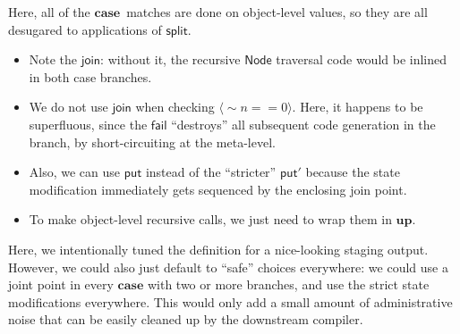 \documentclass[acmsmall,screen,review,anonymous]{acmart}
\newcommand{\mit}[1]{{\mathsf{#1}}}
\newcommand{\msf}[1]{{\mathsf{#1}}}
\newcommand{\mbf}[1]{{\mathbf{#1}}}
\newcommand{\bs}[1]{\boldsymbol{#1}}
\newcommand{\Node}{\msf{Node}}
\newcommand{\case}{\mbf{case\,}}
\newcommand{\spl}{{\bs{\sim}}}
\newcommand{\ql}{{\bs{\langle}}}
\newcommand{\qr}{{\bs{\rangle}}}
\theoremstyle{remark}
\newcommand{\mup}{\mbf{up}}
\newcommand{\qt}[1]{\ql#1\qr}
\newcommand{\join}{\mit{join}}
\begin{document}
Here, all of the $\case$ matches are done on object-level values, so they are
all desugared to applications of $\msf{split}$.
\begin{itemize}
\item Note the $\join$: without it, the recursive $\Node$ traversal code would be inlined in both case branches.
\item We do not use $\join$ when checking $\qt{\spl n == 0}$. Here, it
      happens to be superfluous, since the $\msf{fail}$ ``destroys'' all subsequent
      code generation in the branch, by short-circuiting at the meta-level.
\item Also, we can use $\msf{put}$ instead of the ``stricter'' $\msf{put'}$ because
      the state modification immediately gets sequenced by the enclosing join point.
\item To make object-level recursive calls, we just need to wrap them in $\mup$.
\end{itemize}
Here, we intentionally tuned the definition for a nice-looking staging output.
However, we could also just default to ``safe'' choices everywhere: we could use
a joint point in every $\mbf{case}$ with two or more branches, and use the
strict state modifications everywhere. This would only add a small amount of
administrative noise that can be easily cleaned up by the downstream compiler.
\end{document}
